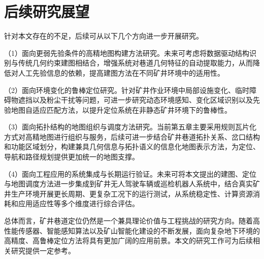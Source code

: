 \section{后续研究展望}

针对本文存在的不足，后续可从以下几个方向进一步开展研究。

（1）面向更弱先验条件的高精地图构建方法研究。未来可考虑将数据驱动结构识别与传统几何约束建图相结合，增强系统对巷道几何特征的自动提取能力，从而降低对人工先验信息的依赖，提高建图方法在不同矿井环境中的适用性。

（2）面向环境变化的鲁棒定位研究。针对矿井作业环境中局部设施变化、临时障碍物遮挡以及粉尘干扰等问题，可进一步研究动态环境感知、变化区域识别以及先验地图自适应匹配方法，以提升定位系统在非静态矿井环境下的鲁棒性。

（3）面向拓扑结构的地图组织与调度方法研究。当前第五章主要采用规则瓦片化方式对高精地图进行组织与服务，后续可进一步结合矿井巷道拓扑关系、岔口结构和功能区域划分，构建兼具几何信息与拓扑语义的信息化地图表示方法，为定位、导航和路径规划提供更加统一的地图支撑。

（4）面向工程应用的系统集成与长期运行验证。未来可将本文提出的建图、定位与地图调度方法进一步集成到矿井无人驾驶车辆或巡检机器人系统中，结合真实矿井生产环境开展更长周期、更复杂工况下的运行测试，从系统稳定性、计算资源消耗和应用适应性等多个维度进行综合评估。

总体而言，矿井巷道定位仍然是一个兼具理论价值与工程挑战的研究方向。随着高性能传感器、智能感知算法以及矿山智能化建设的不断发展，面向复杂地下环境的高精度、高鲁棒定位方法将具有更加广阔的应用前景。本文的研究工作可为后续相关研究提供一定参考。

\newpage
